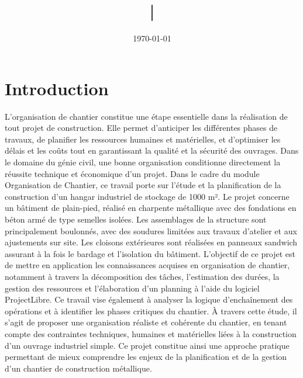 \documentclass[12pt,a4paper]{report}
\title{|}
\author{}
\date{\today}
\begin{document}
	
	
	\tableofcontents
	
	\newpage
	
	
	
	\chapter*{Introduction}
	
	
	
	L’organisation de chantier constitue une étape essentielle dans la réalisation de tout projet de construction. Elle permet d’anticiper les différentes phases de travaux, de planifier les ressources humaines et matérielles, et d’optimiser les délais et les coûts tout en garantissant la qualité et la sécurité des ouvrages. Dans le domaine du génie civil, une bonne organisation conditionne directement la réussite technique et économique d’un projet.
	\vspace{\baselineskip}
	Dans le cadre du module Organisation de Chantier, ce travail porte sur l’étude et la planification de la construction d’un hangar industriel de stockage de 1000 m². Le projet concerne un bâtiment de plain-pied, réalisé en charpente métallique avec des fondations en béton armé de type semelles isolées. Les assemblages de la structure sont principalement boulonnés, avec des soudures limitées aux travaux d’atelier et aux ajustements sur site. Les cloisons extérieures sont réalisées en panneaux sandwich assurant à la fois le bardage et l’isolation du bâtiment.
	\vspace{\baselineskip}
	L’objectif de ce projet est de mettre en application les connaissances acquises en organisation de chantier, notamment à travers la décomposition des tâches, l’estimation des durées, la gestion des ressources et l’élaboration d’un planning à l’aide du logiciel ProjectLibre. Ce travail vise également à analyser la logique d’enchaînement des opérations et à identifier les phases critiques du chantier.
	\vspace{\baselineskip}
	À travers cette étude, il s’agit de proposer une organisation réaliste et cohérente du chantier, en tenant compte des contraintes techniques, humaines et matérielles liées à la construction d’un ouvrage industriel simple. Ce projet constitue ainsi une approche pratique permettant de mieux comprendre les enjeux de la planification et de la gestion d’un chantier de construction métallique.
	
\end{document}

